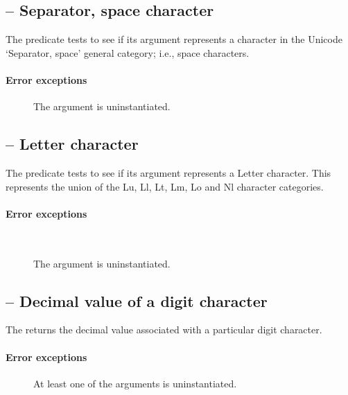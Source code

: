 \subsection{ -- Separator, space character}
\label{chars:isZsChar}

The  predicate tests to see if its  argument represents a character in the Unicode `Separator, space' general category; i.e., space characters.
        
\paragraph{Error exceptions}
\begin{description}
\item[]
The argument is uninstantiated.
\end{description}

\subsection{ -- Letter character}
\label{chars:isletterchar}

The  predicate tests to see if its  argument represents  a Letter character. This represents the union of the Lu, Ll, Lt, Lm, Lo and Nl character categories.
    
\paragraph{Error exceptions}\
\begin{description}
\item[]
The argument is uninstantiated.
\end{description}

\subsection{ -- Decimal value of a digit character}
\synopsis{\_\_digitCode}{[char]\funarrow{}integer}
\label{chars:digitcode}

The  returns the decimal value associated with a particular digit character.

\paragraph{Error exceptions}
\begin{description}
\item[]
At least one of the arguments is uninstantiated.
\end{description}

